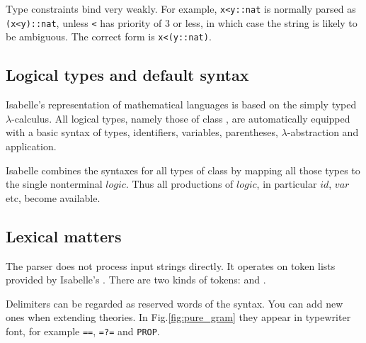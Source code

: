 \begin{warn}
  Type constraints bind very weakly.  For example, \verb!x<y::nat! is normally
  parsed as \verb!(x<y)::nat!, unless \verb$<$ has priority of 3 or less, in
  which case the string is likely to be ambiguous.  The correct form is
  \verb!x<(y::nat)!.
\end{warn}

\subsection{Logical types and default syntax}\label{logical-types}

Isabelle's representation of mathematical languages is based on the
simply typed $\lambda$-calculus.  All logical types, namely those of
class , are automatically equipped with a basic syntax of
types, identifiers, variables, parentheses, $\lambda$-abstraction and
application.
\begin{warn}
  Isabelle combines the syntaxes for all types of class  by
  mapping all those types to the single nonterminal $logic$.  Thus all
  productions of $logic$, in particular $id$, $var$ etc, become available.
\end{warn}


\subsection{Lexical matters}
The parser does not process input strings directly.  It operates on token
lists provided by Isabelle's .  There are two kinds of
tokens:  and .

Delimiters can be regarded as reserved words of the syntax.  You can
add new ones when extending theories.  In Fig.\ts\ref{fig:pure_gram} they
appear in typewriter font, for example {\tt ==}, {\tt =?=} and
{\tt PROP}\@.

